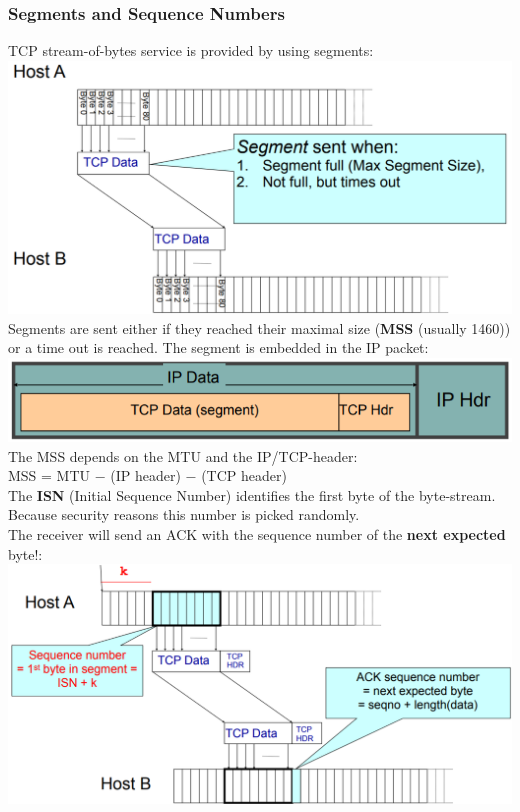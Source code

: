 \documentclass[a4paper, fontsize=8pt, landscape, DIV=1]{scrartcl}
\begin{document}
\begin{multicols*}{4}
		\subsubsection{Segments and Sequence Numbers}
		TCP stream-of-bytes service is provided by using segments:\\ 
		\includegraphics[width=\columnwidth]{images/Transport_Layer/segment_send.png}
		Segments are sent either if they reached their maximal size (\textbf{MSS} (usually 1460)) or a time out is reached. The segment is embedded in the IP packet:
		\includegraphics[width=\columnwidth]{images/Transport_Layer/TCP_in_IP.png}
		The MSS depends on the MTU and the IP/TCP-header:\\
		MSS = MTU $-$ (IP header) $-$ (TCP header)\\
		The \textbf{ISN} (Initial Sequence Number) identifies the first byte of the byte-stream. Because security reasons this number is picked randomly. \\
		The receiver will send an ACK with the sequence number of the \textbf{next expected} byte!:
		\includegraphics[width=\columnwidth]{images/Transport_Layer/ACK_seqnumb.png}
		

\end{multicols*}
\end{document}

